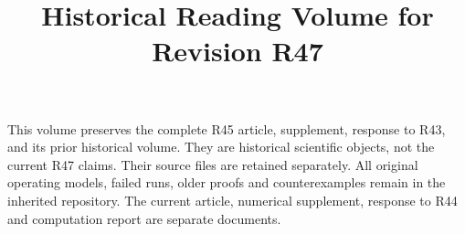 \documentclass[ecta]{econsocart}
\begin{document}
\begin{frontmatter}\title{Historical Reading Volume for Revision R47}\end{frontmatter}
This volume preserves the complete R45 article, supplement, response to R43, and its prior historical volume. They are historical scientific objects, not the current R47 claims. Their source files are retained separately. All original operating models, failed runs, older proofs and counterexamples remain in the inherited repository. The current article, numerical supplement, response to R44 and computation report are separate documents.




\end{document}
